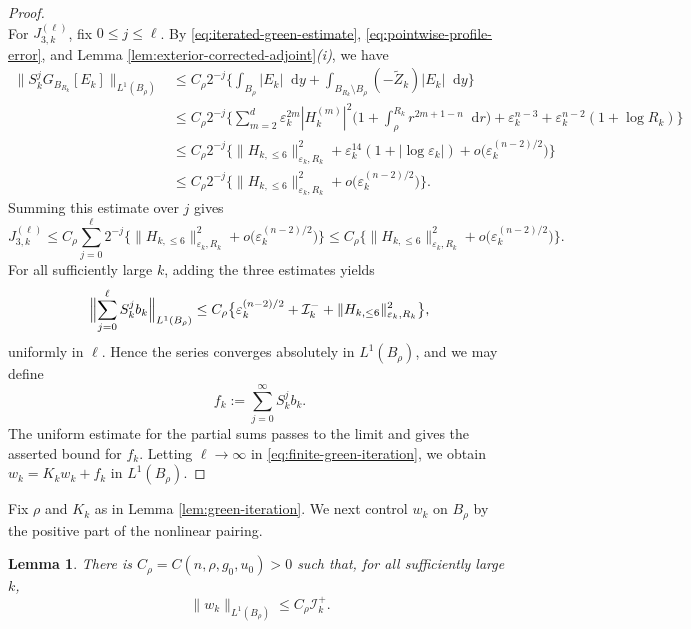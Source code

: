 \documentclass[11pt]{article}
\numberwithin{equation}{section}
\newtheorem{lemma}[theorem]{Lemma}
\theoremstyle{remark}
\newcommand{\dd}{\mathop{}\!\mathrm{d}}
\begin{document}
\begin{proof}
{\[\]
}
 For $J_{3,k}^{(\ell)}$, fix $0\le j\le\ell$.  By
\eqref{eq:iterated-green-estimate},
\eqref{eq:pointwise-profile-error}, and
Lemma  \ref{lem:exterior-corrected-adjoint}\emph{(i)}, we have
{
\[
\begin{aligned}
 \Big\|S_k^jG_{B_{R_k}}[E_k]
 \Big\|_{L^1(B_\rho)}
 &\le C_\rho 2^{-j}
 \Big\{
 \int_{B_\rho}|E_k|\dd y
 +\int_{B_{R_k}\setminus B_\rho}(-\widetilde Z_k)|E_k|\dd y
 \Big\}\\
 &\le C_\rho 2^{-j}
 \Big\{
 \sum_{m=2}^d\varepsilon_k^{2m}|H_k^{(m)}|^2
 \bigg(1+\int_\rho^{R_k}r^{2m+1-n}\dd r\bigg)
 +\varepsilon_k^{n-3}
 +\varepsilon_k^{n-2}(1+\log R_k)
 \Big\}\\
 &\le C_\rho 2^{-j}\big\{
 \|H_{k,\le6}\|_{\varepsilon_k,R_k}^2
 +\varepsilon_k^{14}(1+|\log\varepsilon_k|)
 +o\bigl(\varepsilon_k^{(n-2)/2}\bigr)\big\}\\
 &\le C_\rho 2^{-j}\big\{
 \|H_{k,\le6}\|_{\varepsilon_k,R_k}^2
 +o\bigl(\varepsilon_k^{(n-2)/2}\bigr)\big\}.
\end{aligned}
\]
}
 Summing this estimate over $j$ gives
{
\[
 J_{3,k}^{(\ell)}
 \le C_\rho\sum_{j=0}^{\ell}2^{-j}
 \big\{\|H_{k,\le6}\|_{\varepsilon_k,R_k}^2
 +o\bigl(\varepsilon_k^{(n-2)/2}\bigr)\big\}
 \le C_\rho\big\{\|H_{k,\le6}\|_{\varepsilon_k,R_k}^2
 +o\bigl(\varepsilon_k^{(n-2)/2}\bigr)\big\}.
\]
}
For all sufficiently large $k$, adding the three estimates yields
{
\[
 \Bigl\|\sum_{j=0}^{\ell}S_k^jb_k\Bigr\|_{L^1(B_\rho)}
 \le C_\rho\big\{\varepsilon_k^{(n-2)/2}+\mathcal I_k^-
 +\|H_{k,\le6}\|_{\varepsilon_k,R_k}^2\big\},
\]
}
uniformly in $\ell$.  Hence the series converges absolutely in
$L^1(B_\rho)$, and we may define
{
\[
 f_k:=\sum_{j=0}^{\infty}S_k^jb_k.
\]
}
{The uniform estimate for the partial sums passes to the limit and gives the asserted
bound for \(f_k\).  Letting \(\ell\to\infty\) in
\eqref{eq:finite-green-iteration}, we obtain}
 $w_k=K_kw_k+f_k$ in $L^1(B_\rho)$.
\end{proof}

 Fix $\rho$ and $K_k$ as in
Lemma  \ref{lem:green-iteration}.  We next control $w_k$ on $B_\rho$ by the
positive part of the nonlinear pairing.

\begin{lemma}\label{lem:fixed-core}
There is $C_\rho=C(n,\rho,g_0,u_0)>0$ such that, for
all sufficiently large $k$,
{
\[
 \|w_k\|_{L^1(B_\rho)}\le C_\rho\mathcal I_k^+.
\]
}
 \end{lemma}
\end{document}
